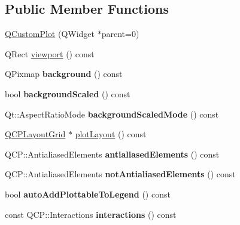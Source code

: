 \subsection*{Public Member Functions}
\begin{DoxyCompactItemize}
\item 
\hyperlink{class_q_custom_plot_a45b99626558651a6428b83972b0b34b8}{Q\+Custom\+Plot} (Q\+Widget $\ast$parent=0)
\item 
Q\+Rect \hyperlink{class_q_custom_plot_a19842409b18f556b256d05e97fffc670}{viewport} () const
\item 
\hypertarget{class_q_custom_plot_a5b9bbc838cb856e31b39c050fad49f9a}{}\label{class_q_custom_plot_a5b9bbc838cb856e31b39c050fad49f9a} 
Q\+Pixmap {\bfseries background} () const
\item 
\hypertarget{class_q_custom_plot_aac96f3a0f5070228ed13602976886b80}{}\label{class_q_custom_plot_aac96f3a0f5070228ed13602976886b80} 
bool {\bfseries background\+Scaled} () const
\item 
\hypertarget{class_q_custom_plot_af8f1ebfdbf48d7c49f95136475d55b14}{}\label{class_q_custom_plot_af8f1ebfdbf48d7c49f95136475d55b14} 
Qt\+::\+Aspect\+Ratio\+Mode {\bfseries background\+Scaled\+Mode} () const
\item 
\hyperlink{class_q_c_p_layout_grid}{Q\+C\+P\+Layout\+Grid} $\ast$ \hyperlink{class_q_custom_plot_af1a1f1f571237deb7c2bd34a5e9f018f}{plot\+Layout} () const
\item 
\hypertarget{class_q_custom_plot_a631762eb183aceecee73d30e108641ee}{}\label{class_q_custom_plot_a631762eb183aceecee73d30e108641ee} 
Q\+C\+P\+::\+Antialiased\+Elements {\bfseries antialiased\+Elements} () const
\item 
\hypertarget{class_q_custom_plot_a75571bc5b2167e83def132fc993091b3}{}\label{class_q_custom_plot_a75571bc5b2167e83def132fc993091b3} 
Q\+C\+P\+::\+Antialiased\+Elements {\bfseries not\+Antialiased\+Elements} () const
\item 
\hypertarget{class_q_custom_plot_ac4b87de13eaceadc8db5a66654197689}{}\label{class_q_custom_plot_ac4b87de13eaceadc8db5a66654197689} 
bool {\bfseries auto\+Add\+Plottable\+To\+Legend} () const
\item 
\hypertarget{class_q_custom_plot_a2c78c5fd2943c148ab76652801d3f2dc}{}\label{class_q_custom_plot_a2c78c5fd2943c148ab76652801d3f2dc} 
const Q\+C\+P\+::\+Interactions {\bfseries interactions} () const
\item 
\hypertarget{class_q_custom_plot_a5441d11013afeaf4b8f2ea06e8624a25}{}\label{class_q_custom_plot_a5441d11013afeaf4b8f2ea06e8624a25} 

\end{DoxyCompactItemize}
